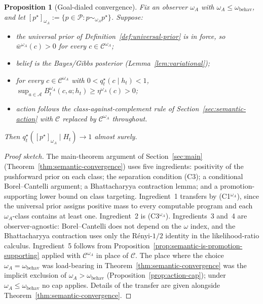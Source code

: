 \documentclass[11pt]{article}
\newtheorem{proposition}[theorem]{Proposition}
\theoremstyle{definition}
\theoremstyle{remark}
\newcommand{\Acal}{\mathcal{A}}
\newcommand{\Ccal}{\mathcal{C}}
\newcommand{\Pcal}{\mathcal{P}}
\begin{document}
\begin{proposition}[Goal-dialed convergence]
\label{prop:goal-dialed}
Fix an observer $\omega_A$ with $\omega_A\le\omega_{\mathrm{behav}}$, and let $[p^\star]_{\omega_A}:=\{p\in\Pcal:p\sim_{\omega_A}p^\star\}$. Suppose:
\begin{itemize}
\item[\textup{(C1$^{\omega_A}$)}] the universal prior of Definition~\ref{def:universal-prior} is in force, so $\bar w^{\omega_A}(c)>0$ for every $c\in\Ccal^{\omega_A}$;
\item[\textup{(C2)}] belief is the Bayes/Gibbs posterior (Lemma~\ref{lem:variational});
\item[\textup{(C3$^{\omega_A}$)}] for every $c\in\Ccal^{\omega_A}$ with $0<q_t^\star(c\mid h_t)<1$, $\sup_{a\in\Acal}B_t^{\omega_A}(c,a;h_t)\ge\eta^{\omega_A}(c)>0$;
\item[\textup{(C4$^{\omega_A}$)}] action follows the class-against-complement rule of Section~\ref{sec:semantic-action} with $\Ccal$ replaced by $\Ccal^{\omega_A}$ throughout.
\end{itemize}
Then $q_t^\star([p^\star]_{\omega_A}\mid H_t)\to 1$ almost surely.
\end{proposition}

\begin{proof}[Proof sketch]
The main-theorem argument of Section~\ref{sec:main} (Theorem~\ref{thm:semantic-convergence}) uses five ingredients: positivity of the pushforward prior on each class; the separation condition (C3); a conditional Borel--Cantelli argument; a Bhattacharyya contraction lemma; and a promotion-supporting lower bound on class targeting. Ingredient~1 transfers by (C1$^{\omega_A}$), since the universal prior assigns positive mass to every computable program and each $\omega_A$-class contains at least one. Ingredient~2 is (C3$^{\omega_A}$). Ingredients~3 and~4 are observer-agnostic: Borel--Cantelli does not depend on the $\omega$ index, and the Bhattacharyya contraction uses only the R\'enyi-$1/2$ identity in the likelihood-ratio calculus. Ingredient~5 follows from Proposition~\ref{prop:semantic-is-promotion-supporting} applied with $\Ccal^{\omega_A}$ in place of $\Ccal$. The place where the choice $\omega_A=\omega_{\mathrm{behav}}$ was load-bearing in Theorem~\ref{thm:semantic-convergence} was the implicit exclusion of $\omega_A>\omega_{\mathrm{behav}}$ (Proposition~\ref{prop:action-cap}); under $\omega_A\le\omega_{\mathrm{behav}}$ no cap applies. Details of the transfer are given alongside Theorem~\ref{thm:semantic-convergence}.
\end{proof}
\end{document}
